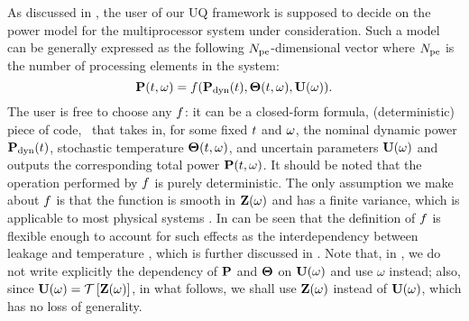 As discussed in , the user of our UQ framework is supposed to decide on the power model for the multiprocessor system under consideration. Such a model can be generally expressed as the following ${N_\text{pe}}$-dimensional vector where ${N_\text{pe}}$ is the number of processing elements in the system:
\begin{equation} \elabel{power-model}
  \vP(\t, \o) = \f(\vP_\dyn(\t), \vTO(\t, \o), \vU(\o)).
\end{equation}
The user is free to choose any $f$: it can be a closed-form formula, (deterministic) piece of code, \etc\ that takes in, for some fixed $t$ and $\omega$, the nominal dynamic power $\mathbf{P}_{\text{dyn}}(t)$, stochastic temperature ${\boldsymbol\Theta}(t, \omega)$, and uncertain parameters $\mathbf{U}(\omega)$ and outputs the corresponding total power $\mathbf{P}(t, \omega)$. It should be noted that the operation performed by $f$ is purely deterministic. The only assumption we make about $f$ is that the function is smooth in $\mathbf{Z}(\omega)$ and has a finite variance, which is applicable to most physical systems \cite{xiu2002}. In can be seen that the definition of $f$ is flexible enough to account for such effects as the interdependency between leakage and temperature \cite{srivastava2010, liu2007}, which is further discussed in . Note that, in , we do not write explicitly the dependency of $\mathbf{P}$ and ${\boldsymbol\Theta}$ on $\mathbf{U}(\omega)$ and use $\omega$ instead; also, since $\mathbf{U}(\omega) = \mathcal{T}\left[\mathbf{Z}(\omega)\right]$, in what follows, we shall use $\mathbf{Z}(\omega)$ instead of $\mathbf{U}(\omega)$, which has no loss of generality.

